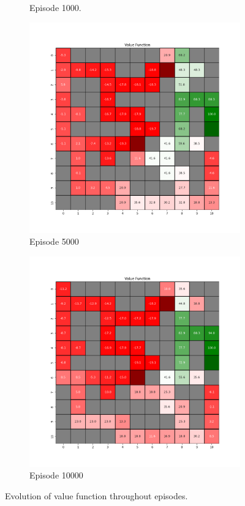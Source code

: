 \documentclass{assignment}
\begin{document}
\begin{figure}[H]
\begin{subfigure}{0.3\textwidth}
    \caption{Episode 1000.}
    \end{subfigure}\hfill
    \begin{subfigure}{0.3\textwidth}
        \includegraphics[width=\textwidth]{figures/value_q/alpha_sweep/value_function_alpha_1_gamma_0.95_epsilon_0.2_iteration_5000.png}
    \caption{Episode 5000}
    \end{subfigure}\hfill
    \begin{subfigure}{0.3\textwidth}
        \includegraphics[width=\textwidth]{figures/value_q/alpha_sweep/value_function_alpha_1_gamma_0.95_epsilon_0.2_iteration_10000.png}
    \caption{Episode 10000}
    \end{subfigure}
    \caption{Evolution of value function throughout episodes.}
    \label{fig:alpha_1_q_learning_value}
\end{figure}
\end{document}
